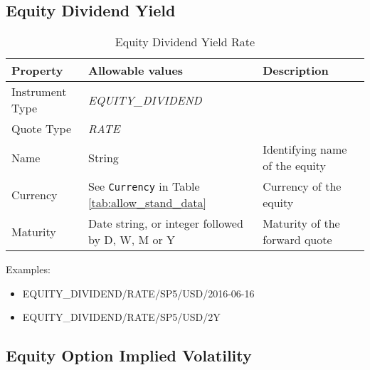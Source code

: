 \subsection{Equity Dividend Yield}

\begin{table}[H]
    \centering
    \begin{tabular}{|p{3cm}|p{3.5cm}|p{7cm}|}
        \hline
        {\bf Property} & {\bf Allowable values} & {\bf Description} \\ \hline
        Instrument Type & \emph{EQUITY\_DIVIDEND} & \\ \hline
        Quote Type & \emph{RATE} & \\ \hline
        Name & String & Identifying name of the equity \\ \hline
        Currency & See \lstinline!Currency! in Table \ref{tab:allow_stand_data}&  Currency of the equity \\ \hline
        Maturity & Date string, or integer followed by D, W, M or Y & Maturity of the forward quote \\ \hline
    \end{tabular}
    \caption{Equity Dividend Yield Rate}
    \label{tab:eqdiv_quote}
\end{table}

\medskip
Examples:
\begin{itemize}
    \item {EQUITY\_DIVIDEND/RATE/SP5/USD/2016-06-16}
    \item {EQUITY\_DIVIDEND/RATE/SP5/USD/2Y}
\end{itemize}

\subsection{Equity Option Implied Volatility}

